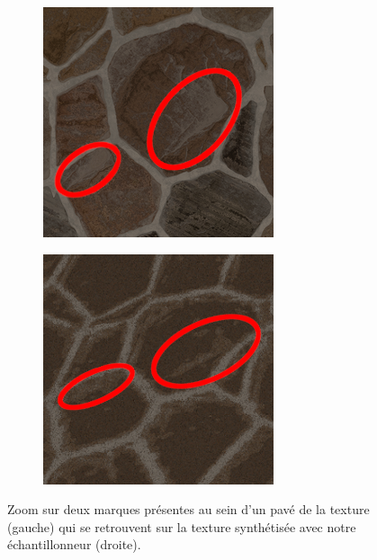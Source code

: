 \begin{figure}
    \centering
    \begin{subfigure}{.45\textwidth}
        \centering
        \includegraphics[width=\textwidth]{contenu/resources/images/marks}
    \end{subfigure}
    \hfill
    \begin{subfigure}{.45\textwidth}
        \centering
        \includegraphics[width=\textwidth]{contenu/resources/images/mark_preserved}
    \end{subfigure}

    \caption[L'échantillonneur préserve partiellement les marques dans les pavés]{Zoom sur deux marques présentes au sein d'un pavé de la texture (gauche) qui se retrouvent sur la texture synthétisée avec notre échantillonneur (droite). }
    \label{fig:mark-preserved}
\end{figure}

